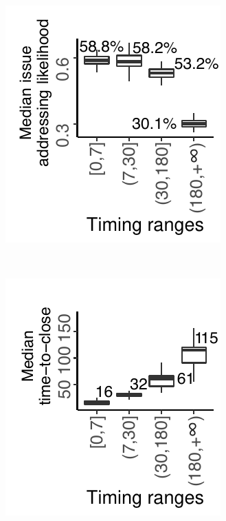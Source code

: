\begin{figure}[t]
    \centering
    \begin{subfigure}[t]{0.5\columnwidth }
        \centering
        \includegraphics[width=\linewidth]{pics/rq2/new/rq2_delta_ratio}
        \caption{}
		\label{fig:rq2_delta_ratio}
    \end{subfigure}%
    ~
    \begin{subfigure}[t]{0.5\columnwidth}
        \centering
        \includegraphics[width=\linewidth]{pics/rq2/new/rq2_closeday_deltaday}

\end{subfigure}
\end{figure}
